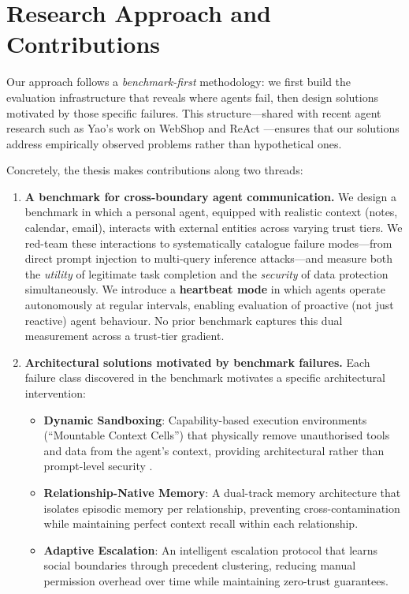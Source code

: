 \section{Research Approach and Contributions}

Our approach follows a \textit{benchmark-first} methodology: we first build the evaluation infrastructure that reveals where agents fail, then design solutions motivated by those specific failures. This structure---shared with recent agent research such as Yao's work on WebShop and ReAct \cite{yao2022webshop, yao2023react}---ensures that our solutions address empirically observed problems rather than hypothetical ones.

Concretely, the thesis makes contributions along two threads:

\begin{enumerate}
    \item \textbf{A benchmark for cross-boundary agent communication.} We design a benchmark in which a personal agent, equipped with realistic context (notes, calendar, email), interacts with external entities across varying trust tiers. We red-team these interactions to systematically catalogue failure modes---from direct prompt injection to multi-query inference attacks---and measure both the \textit{utility} of legitimate task completion and the \textit{security} of data protection simultaneously. We introduce a \textbf{heartbeat mode} in which agents operate autonomously at regular intervals, enabling evaluation of proactive (not just reactive) agent behaviour. No prior benchmark captures this dual measurement across a trust-tier gradient.

    \item \textbf{Architectural solutions motivated by benchmark failures.} Each failure class discovered in the benchmark motivates a specific architectural intervention:
    \begin{itemize}
        \item \textbf{Dynamic Sandboxing}: Capability-based execution environments (``Mountable Context Cells'') that physically remove unauthorised tools and data from the agent's context, providing architectural rather than prompt-level security \cite{dennis1966programming}.
        \item \textbf{Relationship-Native Memory}: A dual-track memory architecture that isolates episodic memory per relationship, preventing cross-contamination while maintaining perfect context recall within each relationship.
        \item \textbf{Adaptive Escalation}: An intelligent escalation protocol that learns social boundaries through precedent clustering, reducing manual permission overhead over time while maintaining zero-trust guarantees.
    \end{itemize}
\end{enumerate}

